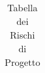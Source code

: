 \begin{center}
\begin{longtable}{>{\centering}p{1cm}|>{\centering}p{2.2cm}|			
	>{}p{5cm}|>{\centering}p{2cm}|>{\centering}p{2cm}}
	\caption{Tabella dei Rischi di Progetto}			
	\end{longtable}
\end{center}
\renewcommand{\arraystretch}{1}
